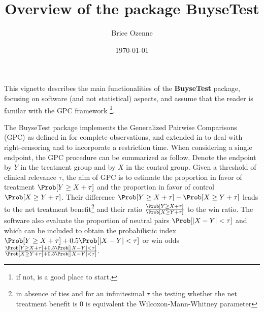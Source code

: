 \documentclass[12pt]{article}
\author{Brice Ozenne}
\date{\today}
\title{Overview of the package BuyseTest}
\begin{document}
\maketitle
This vignette describes the main functionalities of the \textbf{BuyseTest}
package, focusing on software (and not statistical) aspects, and assume
that the reader is familar with the GPC framework \footnote{if not,
\cite{buyse2010generalized} is a good place to start.}.

\bigskip

The BuyseTest package implements the Generalized Pairwise Comparisons
(GPC) as defined in \cite{buyse2010generalized} for complete
observations, and extended in \cite{peron2018extension} to deal with
right-censoring and \cite{piffoux2024restricted} to incorporate a
restriction time. When considering a single endpoint, the GPC
procedure can be summarized as follow. Denote the endpoint by \(Y\) in
the treatment group and by \(X\) in the control group. Given a
threshold of clinical relevance \(\tau\), the aim of GPC is to
estimate the proportion in favor of treatment \(\Prob[Y \geq X +
\tau]\) and the proportion in favor of control \(\Prob[X \geq Y +
\tau]\). Their difference \(\Prob[Y \geq X + \tau]-\Prob[X \geq Y +
\tau]\) leads to the net treatment benefit\footnote{in absence of ties and
for an infinitesimal \(\tau\) the testing whether the net treatment
benefit is 0 is equivalent the Wilcoxon-Mann-Whitney parameter} and
their ratio \(\frac{\Prob[Y \geq X + \tau]}{\Prob[X \geq Y + \tau]}\)
to the win ratio. The software also evaluate the proportion of neutral
pairs \(\Prob[ |X - Y| < \tau]\) and which can be included to obtain
the probabilistic index \(\Prob[Y \geq X + \tau] + 0.5 \Prob[ |X - Y|
< \tau]\) or win odds \(\frac{\Prob[Y \geq X + \tau] + 0.5 \Prob[ |X -
Y| < \tau] }{\Prob[X \geq Y + \tau] + 0.5\Prob[ |X - Y| < \tau]}\).
\end{document}
